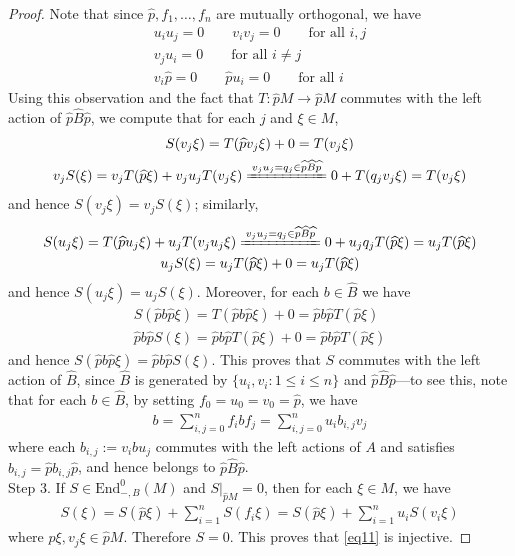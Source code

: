 \documentclass[11pt,b5paper,notitlepage]{article}
\theoremstyle{definition}
\theoremstyle{plain}
\newcommand{\wht}{\widehat}
\newcommand{\End}{\mathrm{End}} %
\numberwithin{equation}{section}
\begin{document}
\begin{proof}
Note that since $\wht p,f_1,\dots,f_n$ are mutually orthogonal, we have
\begin{gather*}
u_iu_j=0\qquad v_iv_j=0\qquad\text{for all }i,j\\
v_ju_i=0\qquad\text{for all } i\neq j\\
v_i\wht p=0\qquad \wht pu_i=0\qquad\text{for all }i
\end{gather*}
Using this observation and the fact that $T:\wht pM\rightarrow\wht pM$ commutes with the left action of $\wht p\wht B\wht p$, we compute that for each $j$ and $\xi\in M$,
  \begin{gather*}
	S(v_j\xi)=T(\wht pv_j \xi)+0= T(v_j \xi)\\
	v_j S(\xi)=v_jT(\wht p\xi)+v_ju_j T(v_j\xi)\xlongequal{v_ju_j=q_j\in \wht p\wht B\wht p}0+T(q_jv_j\xi)=T(v_j \xi)
  \end{gather*}
and hence $S(v_j\xi)=v_j S(\xi)$; similarly,
  \begin{gather*}
	S(u_j \xi)=T(\wht pu_j \xi)+u_jT(v_ju_j\xi)\xlongequal{v_ju_j=q_j\in \wht p\wht B\wht p}  0+u_jq_jT(\wht p\xi)=u_j T(\wht p\xi)\\
	u_j S(\xi)=u_j T(\wht p\xi)+0=u_j T(\wht p\xi)
  \end{gather*}
and hence $S(u_j\xi)=u_j S(\xi)$. Moreover, for each $b\in\wht B$ we have
\begin{gather*}
S(\wht pb\wht p\xi)=T(\wht pb\wht p\xi)+0=\wht pb\wht pT(\wht p\xi)\\
\wht pb\wht pS(\xi)=\wht pb\wht pT(\wht p\xi)+0=\wht pb\wht pT(\wht p\xi)
\end{gather*}
and hence $S(\wht pb\wht p\xi)=\wht pb\wht pS(\xi)$. This proves that $S$ commutes with the left action of $\wht B$, since $\wht B$ is generated by $\{u_i,v_i:1\leq i\leq n\}$ and $\wht p\wht B\wht p$---to see this, note that for each $b\in\wht B$, by setting $f_0=u_0=v_0=\wht p$, we have
\begin{align*}
b=\sum_{i,j=0}^n f_ibf_j=\sum_{i,j=0}^nu_ib_{i,j}v_j
\end{align*}
where each $b_{i,j}:=v_ibu_j$ commutes with the left actions of $A$ and satisfies $b_{i,j}=\wht pb_{i,j}\wht p$, and hence belongs to $\wht p\wht B\wht p$. \\[-1ex]

Step 3. If $S\in\End^0_{-,B}(M)$ and $S|_{\wht pM}=0$, then for each $\xi\in M$, we have
\begin{align*}
S(\xi)=S(\wht p\xi)+\sum_{i=1}^n S(f_i\xi)=S(\wht p\xi)+\sum_{i=1}^n u_iS(v_i\xi)
\end{align*}
where $\wht p\xi,v_j\xi\in\wht p M$. Therefore $S=0$. This proves that \eqref{eq11} is injective.
\end{proof}
\end{document}
